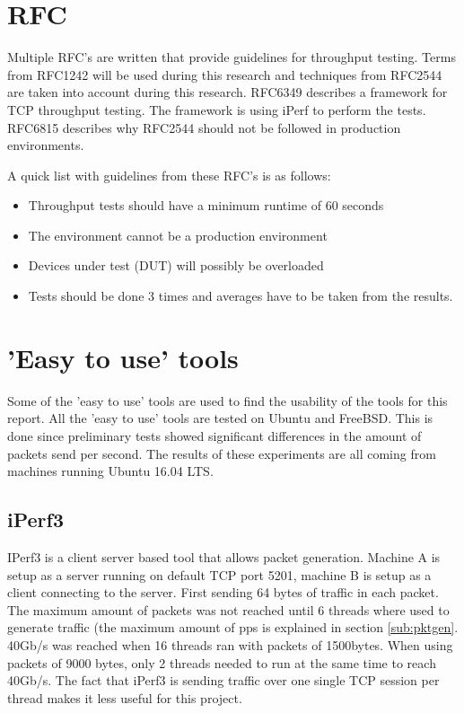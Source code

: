 \section{RFC}\label{sub:rfc}
Multiple RFC's are written that provide guidelines for throughput testing.
Terms from RFC1242 \cite{rfc1242} will be used during this research and techniques from RFC2544 \cite{rfc2544} are taken into account during this research.
RFC6349 \cite{rfc6349} describes a framework for TCP throughput testing. The framework is using iPerf to perform the tests.
RFC6815 \cite{rfc6815} describes why RFC2544 should not be followed in production environments. 

A quick list with guidelines from these RFC's is as follows:

\begin{itemize}
\item{Throughput tests should have a minimum runtime of 60 seconds}
\item{The environment cannot be a production environment}
\item{Devices under test (DUT) will possibly be overloaded}
\item{Tests should be done 3 times and averages have to be taken from the results.}
\end{itemize} 

\section{'Easy to use' tools}
Some of the 'easy to use' tools are used to find the usability of the tools for this report. All the 'easy to use' tools are tested on Ubuntu and FreeBSD. This is done since preliminary tests showed significant differences in the amount of packets send per second. The results of these experiments are all coming from machines running Ubuntu 16.04 LTS.  

\subsection{iPerf3}
IPerf3 is a client server based tool that allows packet generation. Machine A is setup as a server running on default TCP port 5201, machine B is setup as a client connecting to the server. 
First sending 64 bytes of traffic in each packet. The maximum amount of packets was not reached until 6 threads where used to generate traffic (the maximum amount of pps is explained in section \ref{sub:pktgen}. 40Gb/s was reached when 16 threads ran with packets of 1500bytes. When using packets of 9000 bytes, only 2 threads needed to run at the same time to reach 40Gb/s. The fact that iPerf3 is sending traffic over one single TCP session per thread makes it less useful for this project.

